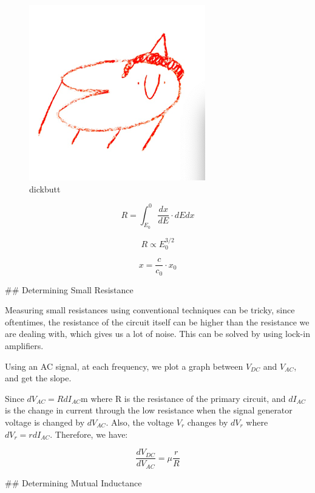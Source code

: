 \documentclass{ieeeconf}
\begin{document}
\begin{figure}[H]
\centering
\includegraphics[width = \columnwidth]{./dickbutt.png}
\caption{dickbutt}
\label{fig:"dickbutt"}
\end{figure}
$$
R=\int_{E_0}^0 \frac{dx}{dE}\cdot dE dx
$$


$$
R \propto E_0^{3/2}
$$

$$
x = \frac{c}{c_0}\cdot x_0
$$

## Determining Small Resistance

Measuring small resistances using conventional techniques can be tricky, since oftentimes, the resistance of the circuit itself can be higher than the resistance we are dealing with, which gives us a lot of noise. This can be solved by using lock-in amplifiers.

Using an AC signal, at each frequency, we plot a graph between $V_{DC}$ and $V_{AC}$, and get the slope.

Since $dV_{AC}=RdI_{AC}$m where R is the resistance of the primary circuit, and $dI_{AC}$ is the change in current through the low resistance when the signal generator voltage is changed by $dV_{AC}$. Also, the voltage $V_r$ changes by $dV_r$ where $dV_r=rdI_{AC}$. Therefore, we have:

$$
\frac{dV_{DC}}{dV_{AC}}=\mu \frac{r}{R}
$$

## Determining Mutual Inductance
\end{document}
